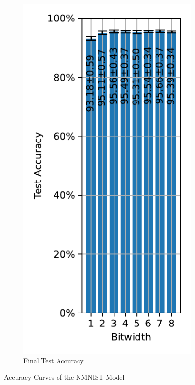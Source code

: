\begin{figure}[H]
\begin{subfigure}[H]{0.3\textwidth}
                \centering
                \includegraphics[width=\textwidth]{../standard/NMNIST/plots/nmnist_final_acc.pdf}
                \caption{Final Test Accuracy}
            \end{subfigure}
            \caption{Accuracy Curves of the NMNIST Model}
        \end{figure}


